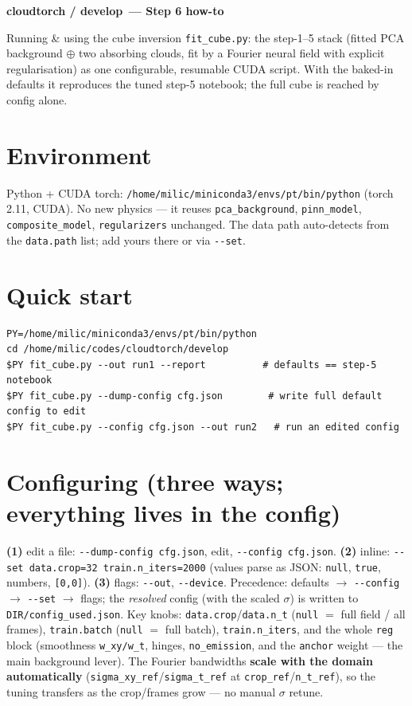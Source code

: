 \documentclass[10pt,a4paper]{article}
\newcommand{\co}[1]{{\small\texttt{#1}}}
\begin{document}
\small

{\sffamily\bfseries\large\color{acc} cloudtorch / develop\, --- Step 6 how-to}

\vspace{1pt}
{\sffamily\color{gry}\footnotesize Running \& using the cube inversion \co{fit\_cube.py}: the step-1--5 stack (fitted PCA background $\oplus$ two absorbing clouds, fit by a Fourier neural field with explicit regularisation) as one configurable, resumable CUDA script. With the baked-in defaults it reproduces the tuned step-5 notebook; the full cube is reached by config alone.}

\vspace{1pt}{\footnotesize\color{gry}\rule{\textwidth}{0.4pt}}

\section{Environment}
Python + CUDA torch: \co{/home/milic/miniconda3/envs/pt/bin/python} (torch 2.11, CUDA). No new physics --- it reuses \co{pca\_background}, \co{pinn\_model}, \co{composite\_model}, \co{regularizers} unchanged. The data path auto-detects from the \co{data.path} list; add yours there or via \co{-{}-set}.

\section{Quick start}
{\small
\begin{verbatim}
PY=/home/milic/miniconda3/envs/pt/bin/python
cd /home/milic/codes/cloudtorch/develop
$PY fit_cube.py --out run1 --report          # defaults == step-5 notebook
$PY fit_cube.py --dump-config cfg.json        # write full default config to edit
$PY fit_cube.py --config cfg.json --out run2   # run an edited config
\end{verbatim}
}

\section{Configuring (three ways; everything lives in the config)}
\textbf{(1)} edit a file: \co{-{}-dump-config cfg.json}, edit, \co{-{}-config cfg.json}. \textbf{(2)} inline: \co{-{}-set data.crop=32 train.n\_iters=2000} (values parse as JSON: \co{null}, \co{true}, numbers, \co{[0,0]}). \textbf{(3)} flags: \co{-{}-out}, \co{-{}-device}. Precedence: defaults $\rightarrow$ \co{-{}-config} $\rightarrow$ \co{-{}-set} $\rightarrow$ flags; the \emph{resolved} config (with the scaled $\sigma$) is written to \co{DIR/config\_used.json}. Key knobs: \co{data.crop}/\co{data.n\_t} (\co{null} $=$ full field / all frames), \co{train.batch} (\co{null} $=$ full batch), \co{train.n\_iters}, and the whole \co{reg} block (smoothness \co{w\_xy/w\_t}, hinges, \co{no\_emission}, and the \co{anchor} weight --- the main background lever). The Fourier bandwidths \textbf{scale with the domain automatically} (\co{sigma\_xy\_ref}/\co{sigma\_t\_ref} at \co{crop\_ref}/\co{n\_t\_ref}), so the tuning transfers as the crop/frames grow --- no manual $\sigma$ retune.
\end{document}
